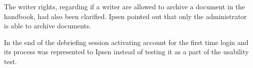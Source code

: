 The writer rights, regarding if a writer are allowed to archive a document in the handbook, had also been clarified.
Ipsen pointed out that only the administrator is able to archive documents.

In the end of the debriefing session activating account for the first time login and its process was represented to Ipsen instead of testing it as a part of the usability test.








